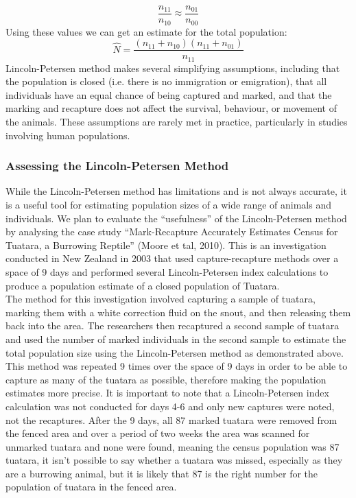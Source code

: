 \documentclass[,oneside]{article}
\numberwithin{equation}{section}
\begin{document}
\begin{equation}
\frac{n_{11}}{n_{10}}\approx\frac{n_{01}}{n_{00}}
\end{equation}
Using these values we can get an estimate for the total population:
\begin{equation}
\hat{N} = \frac{(n_{11}+n_{10})(n_{11}+n_{01})}{n_{11}}
\end{equation}
Lincoln-Petersen method makes several simplifying assumptions, including that the population is closed (i.e. there is no immigration or emigration), that all individuals have an equal chance of being captured and marked, and that the marking and recapture does not affect the survival, behaviour, or movement of the animals. These assumptions are rarely met in practice, particularly in studies involving human populations.
\subsubsection{Assessing the Lincoln-Petersen Method}
While the Lincoln-Petersen method has limitations and is not always accurate, it is a useful tool for estimating population sizes of a wide range of animals and individuals. We plan to evaluate the “usefulness” of the Lincoln-Petersen method by analysing the case study “Mark-Recapture Accurately Estimates Census for Tuatara, a Burrowing Reptile” (Moore et tal, 2010). This is an investigation conducted in New Zealand in 2003 that used capture-recapture methods over a space of 9 days and performed several Lincoln-Petersen index calculations to produce a population estimate of a closed population of Tuatara. \\
The method for this investigation involved capturing a sample of tuatara, marking them with a white correction fluid on the snout, and then releasing them back into the area. The researchers then recaptured a second sample of tuatara and used the number of marked individuals in the second sample to estimate the total population size using the Lincoln-Petersen method as demonstrated above. This method was repeated 9 times over the space of 9 days in order to be able to capture as many of the tuatara as possible, therefore making the population estimates more precise. It is important to note that a Lincoln-Petersen index calculation was not conducted for days 4-6 and only new captures were noted, not the recaptures. After the 9 days, all 87 marked tuatara were removed from the fenced area and over a period of two weeks the area was scanned for unmarked tuatara and none were found, meaning the census population was 87 tuatara, it isn’t possible to say whether a tuatara was missed, especially as they are a burrowing animal, but it is likely that 87 is the right number for the population of tuatara in the fenced area.\\
\end{document}
